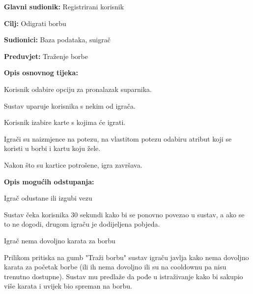 				\noindent {}
				\begin{packed_item}
					
					\item \textbf{Glavni sudionik: }Registrirani korisnik
					\item  \textbf{Cilj:} Odigrati borbu
					\item  \textbf{Sudionici:} Baza podataka, suigrač
					\item  \textbf{Preduvjet:} Traženje borbe
					\item  \textbf{Opis osnovnog tijeka:}
					
					\item[] \begin{packed_enum}
						
						\item Korisnik odabire opciju za pronalazak suparnika.
						\item Sustav uparuje korisnika s nekim od igrača.
						\item Korisnik izabire karte s kojima će igrati.
						\item Igrači su naizmjence na potezu, na vlastitom potezu odabiru atribut koji se koristi u borbi i kartu koju žele.
						\item Nakon što su kartice potrošene, igra završava.
					\end{packed_enum}
					
					\item  \textbf{Opis mogućih odstupanja:}
					
					\item[] \begin{packed_item}
						
						\item[1.a] Igrač odustane ili izgubi vezu
						\item[] \begin{packed_enum}
							
							\item  Sustav čeka korisnika 30 sekundi kako bi se ponovno povezao u sustav, a ako se to ne dogodi, drugom igraču je dodijeljena pobjeda.
							
						\end{packed_enum}
						\item[2.a] Igrač nema dovoljno karata za borbu
						\item[] \begin{packed_enum}
							
							\item  Prilikom pritiska na gumb "Traži borbu" sustav igraču javlja kako nema dovoljno karata za početak borbe (ili ih nema dovoljno ili su na cooldownu pa nisu trenutno dostupne). Sustav mu predlaže da pođe u istraživanje kako bi sakupio više karata i uvijek bio spreman na borbu.
							
						\end{packed_enum}
						
					\end{packed_item}
				\end{packed_item}
				
